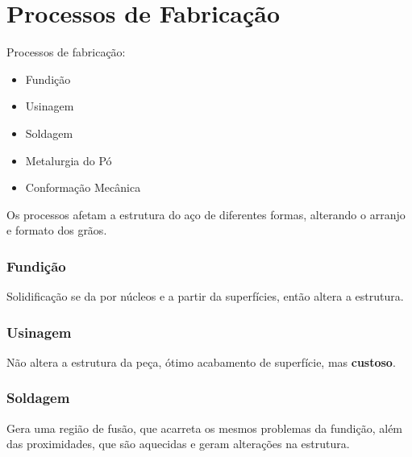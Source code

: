 
\section*{Processos de Fabricação}

Processos de fabricação:
\begin{itemize}
    \item Fundição
    \item Usinagem
    \item Soldagem
    \item Metalurgia do Pó
    \item Conformação Mecânica
\end{itemize}

Os processos afetam a estrutura do aço de diferentes formas, alterando o arranjo e formato dos grãos.

\subsubsection*{Fundição}

Solidificação se da por núcleos e a partir da superfícies, então altera a estrutura.

\subsubsection*{Usinagem}

Não altera a estrutura da peça, ótimo acabamento de superfície, mas \textbf{custoso}.

\subsubsection*{Soldagem}

Gera uma região de fusão, que acarreta os mesmos problemas da fundição, além das proximidades, que são aquecidas e geram alterações na estrutura.

